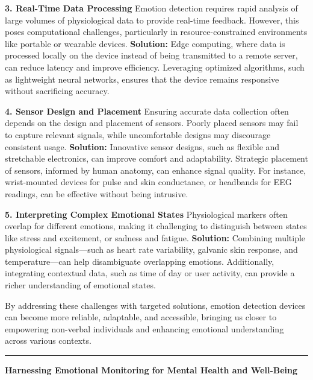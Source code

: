 \documentclass[12pt, research paper]{report}
\begin{document}
	\noindent \textbf{3. Real-Time Data Processing}
	\newline Emotion detection requires rapid analysis of large volumes of physiological data to provide real-time feedback. However, this poses computational challenges, particularly in resource-constrained environments like portable or wearable devices.
	\newline \textbf{Solution:} Edge computing, where data is processed locally on the device instead of being transmitted to a remote server, can reduce latency and improve efficiency. Leveraging optimized algorithms, such as lightweight neural networks, ensures that the device remains responsive without sacrificing accuracy.
	\bigskip
	
	\noindent \textbf{4. Sensor Design and Placement}
	\newline Ensuring accurate data collection often depends on the design and placement of sensors. Poorly placed sensors may fail to capture relevant signals, while uncomfortable designs may discourage consistent usage.
	\newline \textbf{Solution:} Innovative sensor designs, such as flexible and stretchable electronics, can improve comfort and adaptability. Strategic placement of sensors, informed by human anatomy, can enhance signal quality. For instance, wrist-mounted devices for pulse and skin conductance, or headbands for EEG readings, can be effective without being intrusive.
	\bigskip
	
	\noindent \textbf{5. Interpreting Complex Emotional States}
	\newline Physiological markers often overlap for different emotions, making it challenging to distinguish between states like stress and excitement, or sadness and fatigue.
	\newline \textbf{Solution:}
	Combining multiple physiological signals—such as heart rate variability, galvanic skin response, and temperature—can help disambiguate overlapping emotions. Additionally, integrating contextual data, such as time of day or user activity, can provide a richer understanding of emotional states.
	\bigskip 
	
	\noindent By addressing these challenges with targeted solutions, emotion detection devices can become more reliable, adaptable, and accessible, bringing us closer to empowering non-verbal individuals and enhancing emotional understanding across various contexts.
	
	\noindent \rule{13.85cm}{0.01cm}
	\newline \textbf{Harnessing Emotional Monitoring for Mental Health and Well-Being}
	
\end{document}
